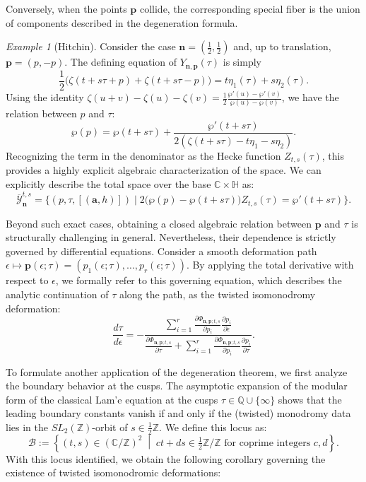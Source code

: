 \documentclass[11pt]{amsart}
\theoremstyle{remark}
\newtheorem{example}[theorem]{Example}
\numberwithin{equation}{section}
\begin{document}
Conversely, when the points $\mathbf{p}$ collide, the corresponding special fiber is the union of components described in the degeneration formula. 

\begin{example}[Hitchin] \label{eg:Hitchin} Consider the case $\mathbf{n} = (\frac{1}{2}, \frac{1}{2})$ and, up to translation, $\mathbf{p} = (p, -p)$. The defining equation of $Y_{\mathbf{n},\mathbf{p}}(\tau)$ is simply
\[
    \frac{1}{2} \Big( \zeta(t+s\tau + p) + \zeta(t+s\tau -p) \Big) = t \eta_1(\tau) + s \eta_2(\tau).
\]
Using the identity $\zeta(u+v) - \zeta(u) - \zeta(v) = \frac{1}{2} \frac{\wp'(u) - \wp'(v)}{\wp(u)-\wp(v)}$, we have the relation between $p$ and $\tau$:
\[
    \wp(p) = \wp(t+s\tau) + \frac{\wp'(t+s\tau)}{2(\zeta(t+s\tau) - t \eta_1 - s\eta_2)}.
\]
Recognizing the term in the denominator as the Hecke function $Z_{t,s}(\tau)$, this provides a highly explicit algebraic characterization of the space. We can explicitly describe the total space over the base $\mathbb{C} \times \mathbb{H}$ as:
\[
\overline{\mathcal{Y}}^{t,s}_{\mathbf{n}} = \Bigg\{ (p, \tau, [ (\mathbf{a},h) ]) 
\;\Bigg|\; 2\Big( \wp(p) - \wp(t+s\tau) \Big) Z_{t,s}(\tau) = \wp'(t+s\tau) \Bigg\}.
\]
\end{example}

\vspace{5mm}

Beyond such exact cases, obtaining a closed algebraic relation between $\mathbf{p}$ and $\tau$ is structurally challenging in general. Nevertheless, their dependence is strictly governed by differential equations. Consider a smooth deformation path $\epsilon \mapsto \mathbf{p}(\epsilon; \tau) = (p_1(\epsilon; \tau), \dots, p_r(\epsilon; \tau))$. By applying the total derivative with respect to $\epsilon$, we formally refer to this governing equation, which describes the analytic continuation of $\tau$ along the path, as the twisted isomonodromy deformation:
\[\displaystyle
    \frac{d \tau}{d \epsilon} = - \frac{ \sum_{i=1}^r \frac{\partial \Phi_{\mathbf{n},\mathbf{p};t,s}}{\partial p_i} \frac{\partial p_i}{\partial \epsilon} }{ \frac{\partial \Phi_{\mathbf{n},\mathbf{p};t,s}}{\partial \tau} + \sum_{i=1}^r \frac{\partial \Phi_{\mathbf{n},\mathbf{p};t,s}}{\partial p_i} \frac{\partial p_i}{\partial \tau} }.
\]


To formulate another application of the degeneration theorem, we first analyze the boundary behavior at the cusps. The asymptotic expansion of the modular form of the classical Lam'e equation at the cusps $\tau \in\mathbb{Q}\cup \{\infty\}$ shows that the leading boundary constants vanish if and only if the (twisted) monodromy data lies in the $SL_2(\mathbb{Z})$-orbit of $s \in \frac{1}{2}\mathbb{Z}$. We define this locus as:$$\mathcal{B} := \left\{ (t,s) \in (\mathbb{C}/\mathbb{Z})^2 \;\middle|\; ct + ds \in \tfrac{1}{2}\mathbb{Z} / \mathbb{Z} \text{ for coprime integers } c,d \right\}.$$With this locus identified, we obtain the following corollary governing the existence of twisted isomonodromic deformations:
\end{document}
